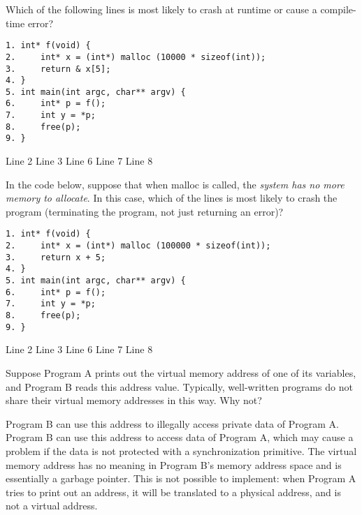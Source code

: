 \variant
Which of the following lines is most likely to crash at runtime or cause a compile-time error?
\begin{verbatim}
1. int* f(void) {
2.     int* x = (int*) malloc (10000 * sizeof(int));
3.     return & x[5];
4. }
5. int main(int argc, char** argv) {
6.     int* p = f();
7.     int y = *p;
8.     free(p);
9. }
\end{verbatim}

\begin{answers}
\answer Line 2
\answer Line 3
\answer Line 6
\answer Line 7
\correctanswer Line 8
\end{answers}
\begin{solution}
\end{solution}

\variant
In the code below, suppose that when malloc is called, the {\em system has no more memory to allocate}.  In this case, which of the lines is most likely to crash the program (terminating the program, not just returning an error)?
\begin{verbatim}
1. int* f(void) {
2.     int* x = (int*) malloc (100000 * sizeof(int));
3.     return x + 5;
4. }
5. int main(int argc, char** argv) {
6.     int* p = f();
7.     int y = *p;
8.     free(p);
9. }
\end{verbatim}
\begin{answers}
\answer Line 2
\answer Line 3
\answer Line 6
\correctanswer Line 7
\answer Line 8
\end{answers}
\begin{solution}
\end{solution}

\variant
Suppose Program A prints out the virtual memory address of one of its variables, and Program B reads this address value.  Typically, well-written programs do not share their virtual memory addresses in this way.  Why not?
\begin{answers}
\answer Program B can use this address to illegally access private data of Program A.
\answer Program B can use this address to access data of Program A, which may cause a problem if the data is not protected with a synchronization primitive.
\correctanswer The virtual memory address has no meaning in Program B's memory address space and is essentially a garbage pointer.
\answer This is not possible to implement: when Program A tries to print out an address, it will be translated to a physical address, and is not a virtual address.

\end{answers}
\begin{solution}
\end{solution}


